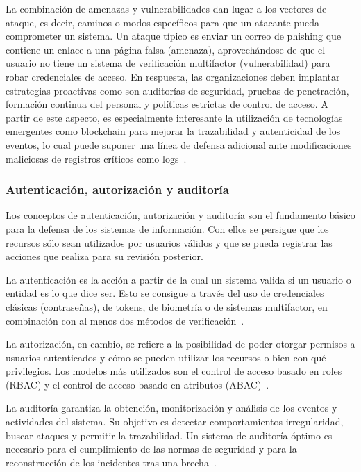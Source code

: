 La combinación de amenazas y vulnerabilidades dan lugar a los vectores de ataque, es decir, caminos o modos específicos para que un atacante pueda comprometer un sistema. Un ataque típico es enviar un correo de phishing que contiene un enlace a una página falsa (amenaza), aprovechándose de que el usuario no tiene un sistema de verificación multifactor (vulnerabilidad) para robar credenciales de acceso.
En respuesta, las organizaciones deben implantar estrategias proactivas como son auditorías de seguridad, pruebas de penetración, formación continua del personal y políticas estrictas de control de acceso. A partir de este aspecto, es especialmente interesante la utilización de tecnologías emergentes como blockchain para mejorar la trazabilidad y autenticidad de los eventos, lo cual puede suponer una línea de defensa adicional ante modificaciones maliciosas de registros críticos como logs~\cite{Crosby2016}.

\subsubsection{Autenticación, autorización y auditoría}

Los conceptos de autenticación, autorización y auditoría son el fundamento básico para la defensa de los sistemas de información. Con ellos se persigue que los recursos sólo sean utilizados por usuarios válidos y que se pueda registrar las acciones que realiza para su revisión posterior.

La autenticación es la acción a partir de la cual un sistema valida si un usuario o entidad es lo que dice ser. Esto se consigue a través del uso de credenciales clásicas (contraseñas), de tokens, de biometría o de sistemas multifactor, en combinación con al menos dos métodos de verificación~\cite{Stallings2017}.

La autorización, en cambio, se refiere a la posibilidad de poder otorgar permisos a usuarios autenticados y cómo se pueden utilizar los recursos o bien con qué privilegios. Los modelos más utilizados son el control de acceso basado en roles (RBAC) y el control de acceso basado en atributos (ABAC)~\cite{Sandhu1996}.

La auditoría garantiza la obtención, monitorización y análisis de los eventos y actividades del sistema. Su objetivo es detectar comportamientos irregularidad, buscar ataques y permitir la trazabilidad. Un sistema de auditoría óptimo es necesario para el cumplimiento de las normas de seguridad y para la reconstrucción de los incidentes tras una brecha~\cite{Bishop2018}.

